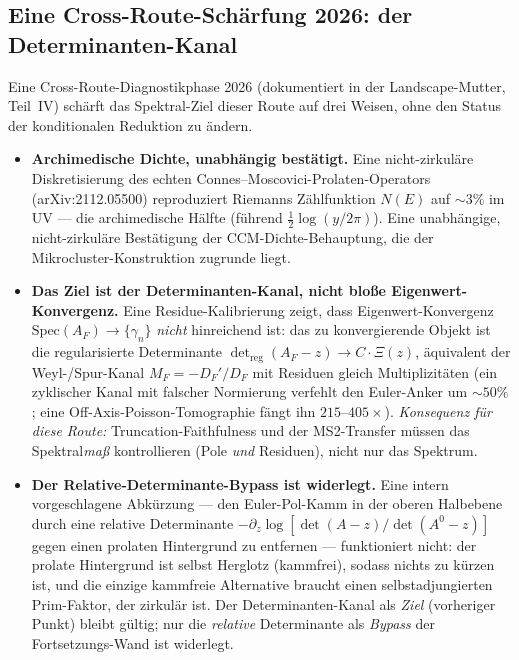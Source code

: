 \documentclass[12pt,a4paper]{article}
\theoremstyle{definition}
\theoremstyle{remark}
\begin{document}
\subsection{Eine Cross-Route-Schärfung 2026: der Determinanten-Kanal}
\label{sec:det-channel-sharpening}

Eine Cross-Route-Diagnostikphase 2026 (dokumentiert in der Landscape-Mutter,
Teil~IV) schärft das Spektral-Ziel dieser Route auf drei Weisen, ohne den Status
der konditionalen Reduktion zu ändern.

\begin{itemize}
  \item \textbf{Archimedische Dichte, unabhängig bestätigt.} Eine nicht-zirkuläre
    Diskretisierung des echten Connes--Moscovici-Prolaten-Operators
    (arXiv:2112.05500) reproduziert Riemanns Zählfunktion $N(E)$ auf $\sim 3\%$ im
    UV --- die archimedische Hälfte (führend $\tfrac12\log(y/2\pi)$). Eine
    unabhängige, nicht-zirkuläre Bestätigung der CCM-Dichte-Behauptung, die der
    Mikrocluster-Konstruktion zugrunde liegt.
  \item \textbf{Das Ziel ist der Determinanten-Kanal, nicht bloße
    Eigenwert-Konvergenz.} Eine Residue-Kalibrierung zeigt, dass
    Eigenwert-Konvergenz $\mathrm{Spec}(A_F)\to\{\gamma_n\}$ \emph{nicht}
    hinreichend ist: das zu konvergierende Objekt ist die regularisierte
    Determinante $\det_{\mathrm{reg}}(A_F-z)\to C\cdot\Xi(z)$, äquivalent der
    Weyl-/Spur-Kanal $M_F=-D_F'/D_F$ mit Residuen gleich Multiplizitäten (ein
    zyklischer Kanal mit falscher Normierung verfehlt den Euler-Anker um
    $\sim 50\%$; eine Off-Axis-Poisson-Tomographie fängt ihn $215$--$405\times$).
    \emph{Konsequenz für diese Route:} Truncation-Faithfulness und der
    MS2-Transfer müssen das Spektral\emph{maß} kontrollieren (Pole \emph{und}
    Residuen), nicht nur das Spektrum.
  \item \textbf{Der Relative-Determinante-Bypass ist widerlegt.} Eine intern
    vorgeschlagene Abkürzung --- den Euler-Pol-Kamm in der oberen Halbebene durch
    eine relative Determinante $-\partial_z\log[\det(A-z)/\det(A^0-z)]$ gegen einen
    prolaten Hintergrund zu entfernen --- funktioniert nicht: der prolate
    Hintergrund ist selbst Herglotz (kammfrei), sodass nichts zu kürzen ist, und
    die einzige kammfreie Alternative braucht einen selbstadjungierten Prim-Faktor,
    der zirkulär ist. Der Determinanten-Kanal als \emph{Ziel} (vorheriger Punkt)
    bleibt gültig; nur die \emph{relative} Determinante als \emph{Bypass} der
    Fortsetzungs-Wand ist widerlegt.
\end{itemize}
\end{document}
